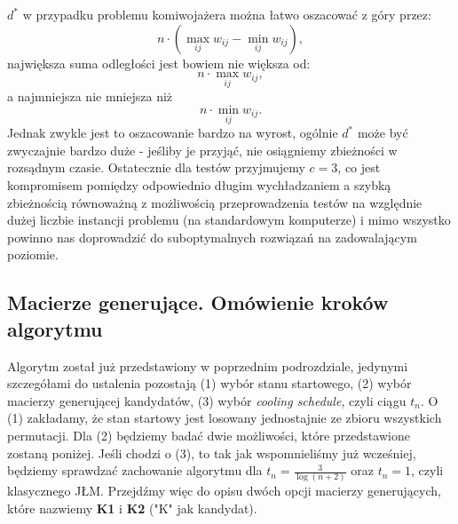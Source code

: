 \documentclass[a4paper]{article}
\theoremstyle{defn}
\theoremstyle{theorem}
\theoremstyle{lemma}
\theoremstyle{cor}
\theoremstyle{fact}
\begin{document}
$d^*$ w przypadku problemu komiwojażera można łatwo oszacować z góry przez: $$n\cdot(\max\limits_{ij} w_{ij} - \min\limits_{ij} w_{ij}),$$ 
największa suma odległości jest bowiem nie większa od: $$n\cdot\max\limits_{ij} w_{ij},$$ 
a najmniejsza nie mniejsza niż 
$$n\cdot\min\limits_{ij} w_{ij}.$$
Jednak zwykle jest to oszacowanie bardzo na wyrost, ogólnie $d^*$ może być zwyczajnie bardzo duże - jeśliby je przyjąć, nie osiągniemy zbieżności w rozsądnym czasie. Ostatecznie dla testów przyjmujemy $c = 3$, co jest kompromisem pomiędzy odpowiednio długim wychładzaniem a szybką zbieżnością równoważną z możliwością przeprowadzenia testów na względnie dużej liczbie instancji problemu (na standardowym komputerze) i mimo wszystko powinno nas doprowadzić do suboptymalnych rozwiązań na zadowalającym poziomie.
\subsection{Macierze generujące. Omówienie kroków algorytmu}
Algorytm został już przedstawiony w poprzednim podrozdziale, jedynymi szczegółami do ustalenia pozostają (1) wybór stanu startowego, (2) wybór macierzy generującej kandydatów, (3) wybór \textit{cooling schedule}, czyli ciągu $t_n$. O (1) zakładamy, że stan startowy jest losowany jednostajnie ze zbioru wszystkich permutacji. Dla (2) będziemy badać dwie możliwości, które przedstawione zostaną poniżej. Jeśli chodzi o (3), to tak jak wspomnieliśmy już wcześniej, będziemy sprawdzać zachowanie algorytmu dla $t_n = \frac{3}{\log (n+2)}$ oraz $t_n=1$, czyli klasycznego JŁM. Przejdźmy więc do opisu dwóch opcji macierzy generujących, które nazwiemy \textbf{K1} i \textbf{K2} ("K" jak kandydat).
\end{document}
